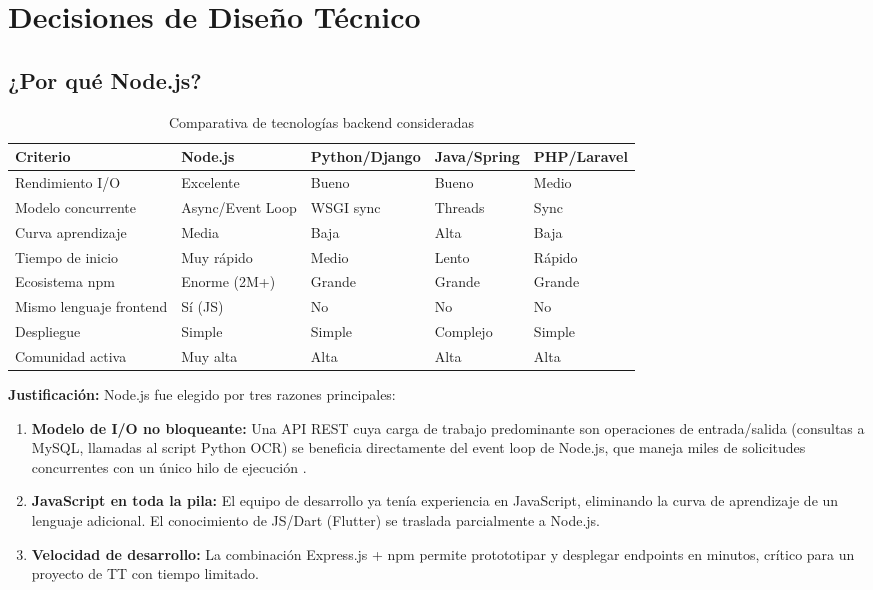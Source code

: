 \chapter{Decisiones de Diseño Técnico}

\section{¿Por qué Node.js?}

\begin{longtable}{p{3cm} >{\centering}p{2cm} >{\centering}p{2.5cm} >{\centering}p{2.5cm} >{\centering\arraybackslash}p{2.5cm}}
  \caption{Comparativa de tecnologías backend consideradas}
  \label{tab:nodejs-vs} \\
  \toprule
  \textbf{Criterio}       & \textbf{Node.js} & \textbf{Python/Django} & \textbf{Java/Spring} & \textbf{PHP/Laravel} \\
  \midrule
  Rendimiento I/O        & Excelente & Bueno     & Bueno     & Medio    \\
  Modelo concurrente     & Async/Event Loop & WSGI sync & Threads  & Sync     \\
  Curva aprendizaje      & Media     & Baja      & Alta      & Baja     \\
  Tiempo de inicio       & Muy rápido & Medio    & Lento     & Rápido   \\
  Ecosistema npm         & Enorme (2M+) & Grande & Grande   & Grande   \\
  Mismo lenguaje frontend & Sí (JS)  & No        & No        & No       \\
  Despliegue             & Simple    & Simple    & Complejo  & Simple   \\
  Comunidad activa       & Muy alta  & Alta      & Alta      & Alta     \\
  \bottomrule
\end{longtable}

\textbf{Justificación:} Node.js fue elegido por tres razones principales:

\begin{enumerate}[leftmargin=1.5cm]
  \item \textbf{Modelo de I/O no bloqueante:} Una API REST cuya carga de trabajo predominante son operaciones de entrada/salida (consultas a MySQL, llamadas al script Python OCR) se beneficia directamente del event loop de Node.js, que maneja miles de solicitudes concurrentes con un único hilo de ejecución \cite{nodejs_event_loop}.
  \item \textbf{JavaScript en toda la pila:} El equipo de desarrollo ya tenía experiencia en JavaScript, eliminando la curva de aprendizaje de un lenguaje adicional. El conocimiento de JS/Dart (Flutter) se traslada parcialmente a Node.js.
  \item \textbf{Velocidad de desarrollo:} La combinación Express.js + npm permite protototipar y desplegar endpoints en minutos, crítico para un proyecto de TT con tiempo limitado.
\end{enumerate}

